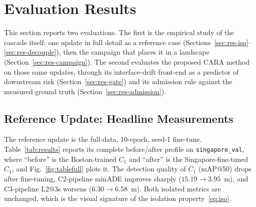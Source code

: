 \documentclass[conference]{IEEEtran}
\begin{document}
\section{Evaluation Results}
\label{sec:results}
This section reports two evaluations. The first is the empirical study of the
cascade itself: one update in full detail as a reference case
(Sections~\ref{sec:res-iso}--\ref{sec:res-decouple}), then the campaign that
places it in a landscape (Section~\ref{sec:res-campaign}). The second evaluates
the proposed CARA method on those same updates, through its interface-drift
front-end as a predictor of downstream risk (Section~\ref{sec:res-gate}) and its
admission rule against the measured ground truth
(Section~\ref{sec:res-admission}).

\subsection{Reference Update: Headline Measurements}
The reference update is the full-data, 10-epoch, seed-1 fine-tune.
Table~\ref{tab:results} reports its complete before/after profile on
\texttt{singapore\_val}, where ``before'' is the Boston-trained $C_1$ and
``after'' is the Singapore-fine-tuned $C_1$, and Fig.~\ref{fig:tablefull}
plots it. The detection quality of $C_1$ (mAP@50) drops after fine-tuning,
C2-pipeline minADE improves sharply ($15.19 \to 3.95$~m), and C3-pipeline
L2@3s worsens ($6.30 \to 6.58$~m). Both isolated metrics are unchanged, which
is the visual signature of the isolation property~\eqref{eq:iso}.
\end{document}
